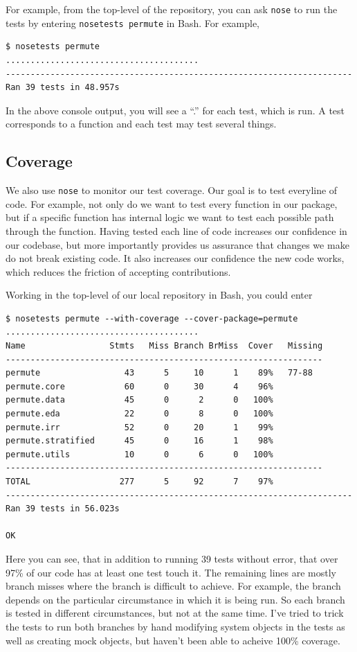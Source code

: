 For example, from the top-level of the repository, you can ask \texttt{nose}
to run the tests by entering \texttt{nosetests permute} in Bash.  For example,

\begin{verbatim}
$ nosetests permute
.......................................
----------------------------------------------------------------------
Ran 39 tests in 48.957s
\end{verbatim}

In the above console output, you will see a ``.'' for each test, which
is run.  A test corresponds to a function and each test may test several
things.

\subsection{Coverage}

We also use \texttt{nose} to monitor our test coverage.  Our goal is to
test everyline of code.  For example, not only do we want to test every
function in our package, but if a specific function has internal logic
we want to test each possible path through the function.  Having tested
each line of code increases our confidence in our codebase, but more
importantly provides us assurance that changes we make do not break
existing code.  It also increases our confidence the new code works,
which reduces the friction of accepting contributions.

Working in the top-level of our local repository in Bash, you could
enter

\begin{verbatim}
$ nosetests permute --with-coverage --cover-package=permute
.......................................
Name                 Stmts   Miss Branch BrMiss  Cover   Missing
----------------------------------------------------------------
permute                 43      5     10      1    89%   77-88
permute.core            60      0     30      4    96%   
permute.data            45      0      2      0   100%   
permute.eda             22      0      8      0   100%   
permute.irr             52      0     20      1    99%   
permute.stratified      45      0     16      1    98%   
permute.utils           10      0      6      0   100%   
----------------------------------------------------------------
TOTAL                  277      5     92      7    97%   
----------------------------------------------------------------------
Ran 39 tests in 56.023s

OK
\end{verbatim}
Here you can see, that in addition to running 39 tests without error,
that over 97\% of our code has at least one test touch it.  The remaining
lines are mostly branch misses where the branch is difficult to achieve.
For example, the branch depends on the particular circumstance in which
it is being run. So each branch is tested in different circumstances, but
not at the same time. I've tried to trick the tests to run both branches by
hand modifying system objects in the tests as well as creating mock objects,
but haven't been able to acheive 100\% coverage.

